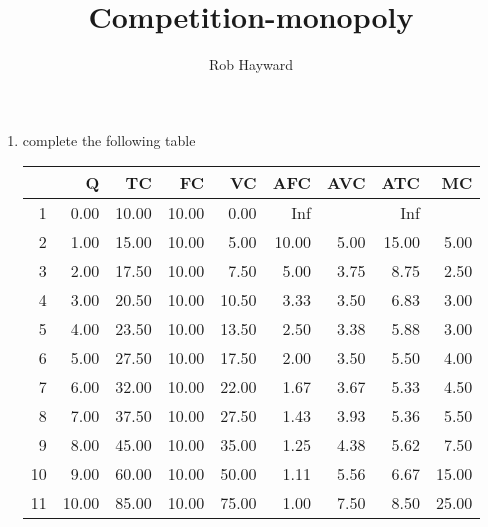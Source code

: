 \documentclass[12pt, a4paper, oneside]{article}\usepackage[]{graphicx}\usepackage[]{color}
\author{Rob Hayward}
\begin{document}
\title{Competition-monopoly}
\maketitle

\begin{enumerate}
\item complete the following table

\begin{table}[ht]
\centering
\begin{tabular}{rrrrrrrrr}
  \hline
 & Q & TC & FC & VC & AFC & AVC & ATC & MC \\ 
  \hline
1 & 0.00 & 10.00 & 10.00 & 0.00 & Inf &  & Inf &  \\ 
  2 & 1.00 & 15.00 & 10.00 & 5.00 & 10.00 & 5.00 & 15.00 & 5.00 \\ 
  3 & 2.00 & 17.50 & 10.00 & 7.50 & 5.00 & 3.75 & 8.75 & 2.50 \\ 
  4 & 3.00 & 20.50 & 10.00 & 10.50 & 3.33 & 3.50 & 6.83 & 3.00 \\ 
  5 & 4.00 & 23.50 & 10.00 & 13.50 & 2.50 & 3.38 & 5.88 & 3.00 \\ 
  6 & 5.00 & 27.50 & 10.00 & 17.50 & 2.00 & 3.50 & 5.50 & 4.00 \\ 
  7 & 6.00 & 32.00 & 10.00 & 22.00 & 1.67 & 3.67 & 5.33 & 4.50 \\ 
  8 & 7.00 & 37.50 & 10.00 & 27.50 & 1.43 & 3.93 & 5.36 & 5.50 \\ 
  9 & 8.00 & 45.00 & 10.00 & 35.00 & 1.25 & 4.38 & 5.62 & 7.50 \\ 
  10 & 9.00 & 60.00 & 10.00 & 50.00 & 1.11 & 5.56 & 6.67 & 15.00 \\ 
  11 & 10.00 & 85.00 & 10.00 & 75.00 & 1.00 & 7.50 & 8.50 & 25.00 \\ 
   \hline
\end{tabular}
\end{table}






\end{enumerate}
\end{document}
